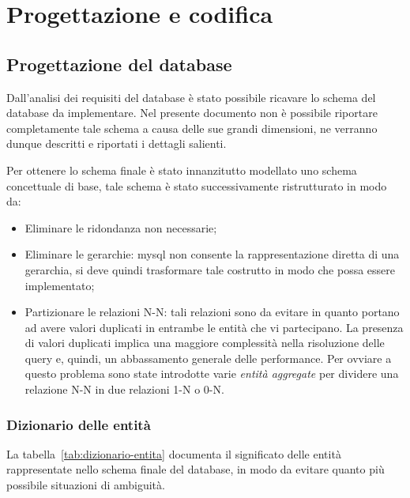
\chapter{Progettazione e codifica}
\label{cap:progettazione-codifica}
\section{Progettazione del database}
\label{sec:progettazione}
Dall'analisi dei requisiti del database è stato possibile ricavare lo schema del database da implementare. Nel presente documento non è possibile riportare completamente tale schema a causa delle sue grandi dimensioni, ne verranno dunque descritti e riportati i dettagli salienti. \bigskip

Per ottenere lo schema finale è stato innanzitutto modellato uno schema concettuale di base, tale schema è stato successivamente ristrutturato in modo da:

\begin{itemize}
	\item Eliminare le \gls{ridondanza}\glsfirstoccur{} non necessarie;
	\item Eliminare le gerarchie: \gls{mysql}\glsfirstoccur{} non consente la rappresentazione diretta di una gerarchia, si deve quindi trasformare tale costrutto in modo che possa essere implementato;
	\item Partizionare le relazioni N-N: tali relazioni sono da evitare in quanto portano ad avere valori duplicati in entrambe le entità che vi partecipano. La presenza di valori duplicati implica una maggiore complessità nella risoluzione delle query e, quindi, un abbassamento generale delle performance. Per ovviare a questo problema sono state introdotte varie \textit{entità aggregate} per dividere una relazione N-N in due relazioni 1-N o 0-N.
\end{itemize}

\subsection{Dizionario delle entità} %
La tabella~\ref{tab:dizionario-entita} documenta il significato delle entità rappresentate nello schema finale del database, in modo da evitare quanto più possibile situazioni di ambiguità. \\

